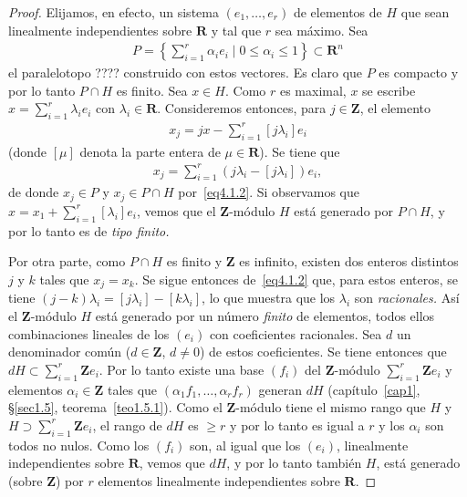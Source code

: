 \documentclass[10pt,oneside,bibtotoc,smallheadings,leqno,a5paper,DIV=12]{scrbook}
\newcommand{\RR}{\mathbf{R}}
\newcommand{\ZZ}{\mathbf{Z}}
\numberwithin{equation}{section}
\theoremstyle{defi}
\theoremstyle{enonce}
\theoremstyle{rem}
\numberwithin{theorem}{section}
\numberwithin{proposition}{section}
\numberwithin{definition}{section}
\numberwithin{lemma}{section}
\numberwithin{corollary}{section}
\numberwithin{example}{section}
\numberwithin{footnote}{section}%
\begin{document}
\begin{proof}
Elijamos, en efecto, un sistema $(e_{1},\dots,e_{r})$ de elementos de $H$ que sean linealmente independientes
sobre $\RR$ y tal que $r$ sea m\'aximo. Sea
\begin{gather}
P = \left\{\sum_{i=1}^{r}\alpha_{i}e_{i}\mid 0\leq\alpha_{i}\leq 1\right\}\subset\RR^{n}
\end{gather}
el paralelotopo ???? construido con estos vectores. Es claro que $P$ es compacto y por lo tanto
$P\cap H$ es finito. Sea $x\in H$. Como $r$ es maximal, $x$ se escribe $x = \sum_{i=1}^{r}\lambda_{i}e_{i}$
con $\lambda_{i}\in\RR$. Consideremos entonces, para $j\in\ZZ$, el elemento
\begin{gather}\label{eq4.1.2}
x_{j} = jx-\sum_{i=1}^{r}[j\lambda_{i}]e_{i}
\end{gather}
(donde $[\mu]$ denota la parte entera de $\mu\in\RR$). Se tiene que
\begin{gather*}
x_{j} = \sum_{i=1}^{r}(j\lambda_{i}-[j\lambda_{i}])e_{i},
\end{gather*}
de donde $x_{j}\in P$ y $x_{j}\in P\cap H$ por~\eqref{eq4.1.2}. Si observamos que $x = x_{1}+\sum_{i=1}^{r}[\lambda_{i}]e_{i}$,
vemos que el $\ZZ$-m\'odulo $H$ est\'a generado por $P\cap H$, y por lo tanto es de {\em tipo finito.}

Por otra parte, como $P\cap H$ es finito y $\ZZ$ es infinito, existen dos enteros distintos $j$ y $k$
tales que $x_{j} = x_{k}$. Se sigue entonces de~\eqref{eq4.1.2} que, para estos enteros, se tiene
$(j-k)\lambda_{i} = [j\lambda_{i}]-[k\lambda_{i}]$, lo que muestra que los $\lambda_{i}$ son
{\em racionales.} As\'i el $\ZZ$-m\'odulo $H$ est\'a generado por un
n\'umero {\em finito} de elementos,
todos ellos combinaciones lineales de los $(e_{i})$ con coeficientes racionales.
Sea $d$ un denominador
com\'un ($d\in\ZZ$, $d\neq 0$) de estos coeficientes. Se tiene entonces
que $dH\subset\sum_{i=1}^{r}\ZZ e_{i}$.
Por lo tanto existe una base $(f_{i})$ del $\ZZ$-m\'odulo $\sum_{i=1}^{r}\ZZ e_{i}$ y elementos
$\alpha_{i}\in\ZZ$ tales que $(\alpha_{1}f_{1},\dots,\alpha_{r}f_{r})$ generan $dH$
(cap\'itulo~\ref{cap1}, \S\ref{sec1.5}, teorema~\ref{teo1.5.1}).
Como el $\ZZ$-m\'odulo tiene el mismo rango que $H$ y $H\supset\sum_{i=1}^{r}\ZZ e_{i}$,
el rango de
$dH$ es $\geq r$ y por lo tanto es igual a $r$ y los $\alpha_{i}$ son todos no nulos.
Como los $(f_{i})$
son, al igual que los $(e_{i})$, linealmente independientes sobre $\RR$, vemos que $dH$,
y por lo tanto
tambi\'en $H$, est\'a generado (sobre $\ZZ$) por $r$ elementos linealmente independientes
sobre $\RR$.
\end{proof}
\end{document}
